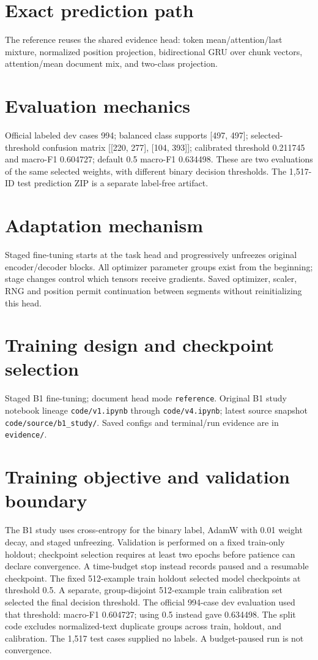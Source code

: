 \documentclass[11pt,a4paper]{article}
\begin{document}
\section{Exact prediction path}
The reference reuses the shared evidence head: token mean/attention/last mixture, normalized position projection, bidirectional GRU over chunk vectors, attention/mean document mix, and two-class projection.
\section{Evaluation mechanics}
Official labeled dev cases 994; balanced class supports [497, 497]; selected-threshold confusion matrix [[220, 277], [104, 393]]; calibrated threshold 0.211745 and macro-F1 0.604727; default 0.5 macro-F1 0.634498. These are two evaluations of the same selected weights, with different binary decision thresholds. The 1,517-ID test prediction ZIP is a separate label-free artifact.
\section{Adaptation mechanism}
Staged fine-tuning starts at the task head and progressively unfreezes original encoder/decoder blocks. All optimizer parameter groups exist from the beginning; stage changes control which tensors receive gradients. Saved optimizer, scaler, RNG and position permit continuation between segments without reinitializing this head.
\section{Training design and checkpoint selection}
Staged B1 fine-tuning; document head mode \texttt{reference}. Original B1 study notebook lineage \texttt{code/v1.ipynb} through \texttt{code/v4.ipynb}; latest source snapshot \texttt{code/source/b1\_study/}. Saved configs and terminal/run evidence are in \texttt{evidence/}.
\section{Training objective and validation boundary}
The B1 study uses cross-entropy for the binary label, AdamW with 0.01 weight decay, and staged unfreezing. Validation is performed on a fixed train-only holdout; checkpoint selection requires at least two epochs before patience can declare convergence. A time-budget stop instead records paused and a resumable checkpoint. The fixed 512-example train holdout selected model checkpoints at threshold 0.5. A separate, group-disjoint 512-example train calibration set selected the final decision threshold. The official 994-case dev evaluation used that threshold: macro-F1 0.604727; using 0.5 instead gave 0.634498. The split code excludes normalized-text duplicate groups across train, holdout, and calibration. The 1,517 test cases supplied no labels. A budget-paused run is not convergence.
\end{document}
